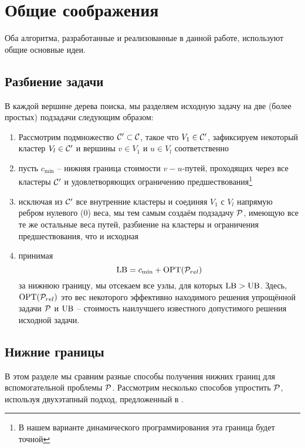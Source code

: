 \section{Общие соображения}\label{sec:pre}
Оба алгоритма,
разработанные и реализованные в данной работе,
используют общие основные идеи.

\subsection{Разбиение задачи}
В каждой вершине дерева поиска,
мы разделяем исходную задачу
на две (более простых) подзадачи
следующим образом:
\begin{enumerate}
	\item
	Рассмотрим подмножество
	$\CX'\subset\CX$,
	такое что $V_1\in\CX'$,
	зафиксируем некоторый кластер $V_l\in\CX'$
	и вершины $v\in V_1$ и $u\in V_l$
	соответственно
	\item
	пусть $c_{\min}$ -- нижняя граница стоимости $v-u$-путей,
	проходящих через все кластеры $\CX'$
	и удовлетворяющих ограничению предшествования\footnote{В нашем варианте динамического программирования эта граница будет точной}
	\item
	исключая из $\CX'$ все внутренние кластеры и соединяя
	$V_1$ с $V_l$ напрямую ребром нулевого (0) веса,
	мы тем самым создаём подзадачу $\P$,
	имеющую все те же остальные веса путей, разбиение на кластеры и ограничения предшествования,
	что и исходная
	\item
	принимая
	\begin{equation}\label{e:bounds}
		\LB = c_{\min} + \OPT{\P_{rel}}
	\end{equation}
	за нижнюю границу,
	мы отсекаем все узлы,
	для которых
	$\LB > \UB$.
	Здесь, $\OPT{\P_{rel}}$
	это вес некоторого эффективно находимого решения упрощённой задачи $\P$
	и $\UB$ -- стоимость наилучшего известного допустимого решения исходной задачи.
\end{enumerate}

\subsection{Нижние границы}\label{ssec:LBs}
В этом разделе мы сравним разные способы получения нижних границ
для вспомогательной проблемы
$\P$.
Рассмотрим несколько способов упростить
$\P$,
используя двухэтапный подход,
предложенный в
\cite{SALMAN2020163}.

